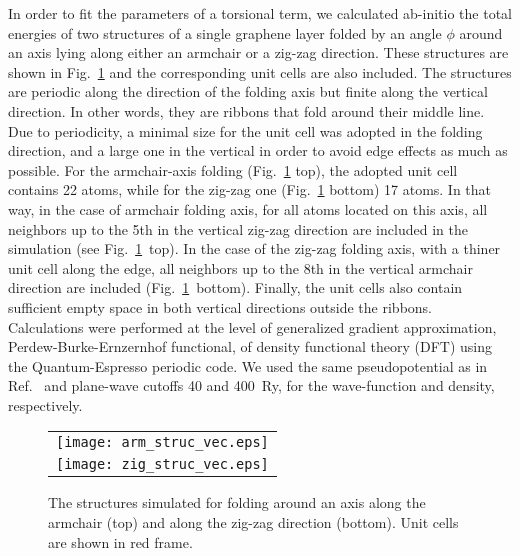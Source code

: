 \documentclass[aps,prb,floatfix,twocolumn,showpacs]{revtex4}
\begin{document}
In order to fit the parameters of a torsional term, we calculated 
ab-initio the total energies of two structures of a single graphene layer folded by an angle $\phi$
around an axis lying along either an armchair or a zig-zag direction. These structures are shown in 
Fig.~\ref{fig:struc_E} and the corresponding unit cells are also included. The structures are 
periodic along the direction of the folding axis but finite along the vertical direction. 
In other words, they are ribbons that fold around their middle line.
Due to periodicity, a minimal size for the unit cell was adopted in the folding 
direction, and a large one in the vertical in order to avoid edge effects as much as possible.
For the armchair-axis folding (Fig.~\ref{fig:struc_E} top), the adopted 
unit cell contains 22 atoms, while for the zig-zag one (Fig.~\ref{fig:struc_E} bottom)
17 atoms. In that way, in the case of armchair folding axis, for all atoms located on this axis,
 all neighbors up to the 5th in the vertical zig-zag direction are included in the simulation
 (see Fig.~\ref{fig:struc_E}~top). In the case of the zig-zag folding axis, with a thiner unit 
cell along the edge, all neighbors up to the 8th in the vertical armchair direction are 
included (Fig.~\ref{fig:struc_E}~bottom). Finally, the unit cells also contain sufficient 
empty space in both vertical directions outside the ribbons.
Calculations were performed at the level of generalized gradient approximation, 
Perdew-Burke-Ernzernhof functional\cite{PBE}, of density functional theory (DFT) using the
Quantum-Espresso periodic code\cite{QE-2009}.   
We used the same pseudopotential\cite{pseudo} as in Ref.~ and plane-wave
cutoffs 40 and 400~Ry, for the wave-function and density, respectively.

\begin{figure}[!tb]
\begin{center}
\begin{tabular}{c}
\texttt{[image: arm\_struc\_vec.eps]} \\
\texttt{[image: zig\_struc\_vec.eps]} \\
\end{tabular}
\end{center}
\caption{ The structures simulated for folding around an axis along the armchair 
(top) and along the zig-zag direction (bottom). Unit cells are shown in red frame.  }
\label{fig:struc_E}
\end{figure}
\end{document}
